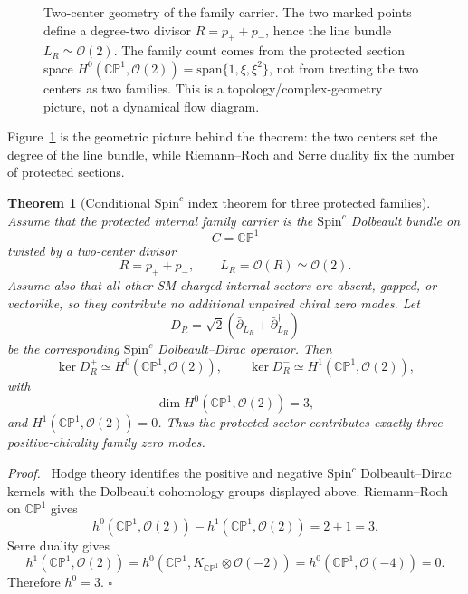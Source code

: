 \documentclass[
  aps,
  prd,
  preprint,
  nofootinbib,
  superscriptaddress,
  longbibliography
]{revtex4-2}
\newcommand{\Spin}{\mathrm{Spin}}
\newcommand{\CP}{\mathbb{CP}}
\newcommand{\cO}{\mathcal{O}}
\newtheorem{theorem}{Theorem}[section]
\newenvironment{proof}{\par\noindent\textit{Proof.}\ }{\hfill\(\square\)\par}
\begin{document}
\begin{figure}[t]
\caption{Two-center geometry of the family carrier.  The two marked points
define a degree-two divisor \(R=p_++p_-\), hence the line bundle
\(L_R\simeq\cO(2)\).  The family count comes from the protected section space
\(H^0(\CP^1,\cO(2))=\mathrm{span}\{1,\xi,\xi^2\}\), not from treating the
two centers as two families.  This is a topology/complex-geometry picture, not
a dynamical flow diagram.}
\label{fig:two-center-o2}
\end{figure}

Figure~\ref{fig:two-center-o2} is the geometric picture behind the theorem:
the two centers set the degree of the line bundle, while Riemann--Roch and
Serre duality fix the number of protected sections.

\begin{theorem}[Conditional \(\Spin^c\) index theorem for three protected families]
Assume that the protected internal family carrier is the \(\Spin^c\)
Dolbeault bundle on
\[
  C=\CP^1
\]
twisted by a two-center divisor
\[
  R=p_+ + p_-,
  \qquad
  L_R=\cO(R)\simeq \cO(2).
\]
Assume also that all other SM-charged internal sectors are absent, gapped, or
vectorlike, so they contribute no additional unpaired chiral zero modes.  Let
\[
  D_R=\sqrt2\left(\bar\partial_{L_R}+\bar\partial_{L_R}^\dagger\right)
\]
be the corresponding \(\Spin^c\) Dolbeault--Dirac operator.  Then
\[
  \ker D_R^+\simeq H^0(\CP^1,\cO(2)),\qquad
  \ker D_R^-\simeq H^1(\CP^1,\cO(2)),
\]
with
\[
  \dim H^0(\CP^1,\cO(2))=3,
\]
and \(H^1(\CP^1,\cO(2))=0\).  Thus the protected sector contributes exactly
three positive-chirality family zero modes.
\end{theorem}

\begin{proof}
Hodge theory identifies the positive and negative \(\Spin^c\)
Dolbeault--Dirac kernels with the Dolbeault cohomology groups displayed above.
Riemann--Roch on \(\CP^1\) gives
\[
  h^0(\CP^1,\cO(2))-h^1(\CP^1,\cO(2))=2+1=3.
\]
Serre duality gives
\[
  h^1(\CP^1,\cO(2))
  =h^0(\CP^1,K_{\CP^1}\otimes\cO(-2))
  =h^0(\CP^1,\cO(-4))=0.
\]
Therefore \(h^0=3\).
\end{proof}
\end{document}
